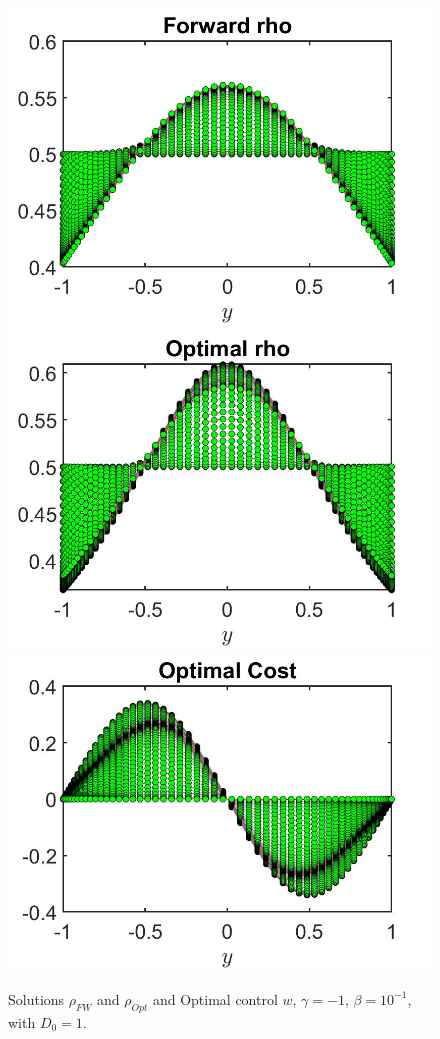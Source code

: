 \documentclass[11pt, a4paper]{article}
\theoremstyle{definition}
\begin{document}
\begin{figure}[h]
	\includegraphics[scale=0.3]{rhoFWD01.jpg}	\includegraphics[scale=0.3]{rhoOptD01.jpg}
	\includegraphics[scale=0.3]{wOptD01.jpg}
	\caption{Solutions $\rho_{FW}$ and $\rho_{Opt}$ and Optimal control $w$, $\gamma = - 1$, $\beta = 10^{-1}$, with $D_0 = 1$.}
	\label{rhoD01}
\end{figure}
\end{document}
